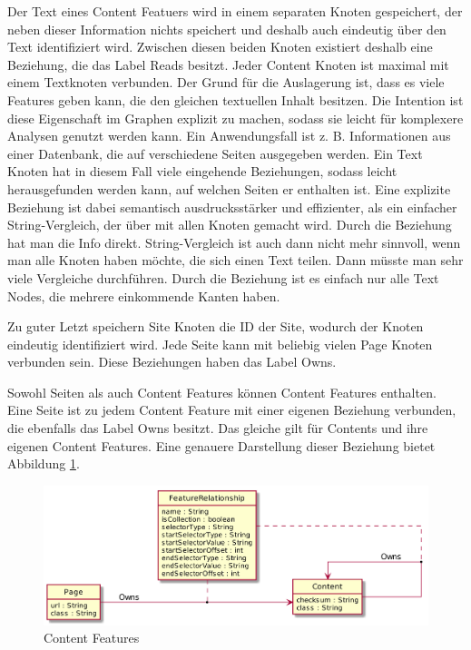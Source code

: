     Der Text eines Content Featuers wird in einem separaten Knoten gespeichert,
    der neben dieser Information nichts speichert und deshalb auch eindeutig über den Text identifiziert wird.
    Zwischen diesen beiden Knoten existiert deshalb eine Beziehung, die das Label Reads besitzt.
    Jeder Content Knoten ist maximal mit einem Textknoten verbunden.
    Der Grund für die Auslagerung ist, dass es viele Features geben kann, die den gleichen textuellen Inhalt besitzen.
    Die Intention ist diese Eigenschaft im Graphen explizit zu machen,
    sodass sie leicht für komplexere Analysen genutzt werden kann.
    Ein Anwendungsfall ist z. B. Informationen aus einer Datenbank,
    die auf verschiedene Seiten ausgegeben werden.
    Ein Text Knoten hat in diesem Fall viele eingehende Beziehungen,
    sodass leicht herausgefunden werden kann, auf welchen Seiten er enthalten ist.
    Eine explizite Beziehung ist dabei semantisch ausdrucksstärker und effizienter,
    als ein einfacher String-Vergleich, der über mit allen Knoten gemacht wird.
    Durch die Beziehung hat man die Info direkt.
    String-Vergleich ist auch dann nicht mehr sinnvoll, wenn man alle Knoten haben möchte,
    die sich einen Text teilen.
    Dann müsste man sehr viele Vergleiche durchführen.
    Durch die Beziehung ist es einfach nur alle Text Nodes, die mehrere einkommende Kanten haben.

    Zu guter Letzt speichern Site Knoten die ID der Site, wodurch der Knoten eindeutig identifiziert wird.
    Jede Seite kann mit beliebig vielen Page Knoten verbunden sein.
    Diese Beziehungen haben das Label Owns.

    Sowohl Seiten als auch Content Features können Content Features enthalten.
    Eine Seite ist zu jedem Content Feature mit einer eigenen Beziehung verbunden,
    die ebenfalls das Label Owns besitzt.
    Das gleiche gilt für Contents und ihre eigenen Content Features.
    Eine genauere Darstellung dieser Beziehung bietet Abbildung \ref{image:dbDataModelContentRelationship}.

    \begin{figure}
        \centering
        \includegraphics[width=\textwidth]{../resources/db-data-model/content-relationship.png}
        \caption{Content Features}
        \label{image:dbDataModelContentRelationship}
    \end{figure}

